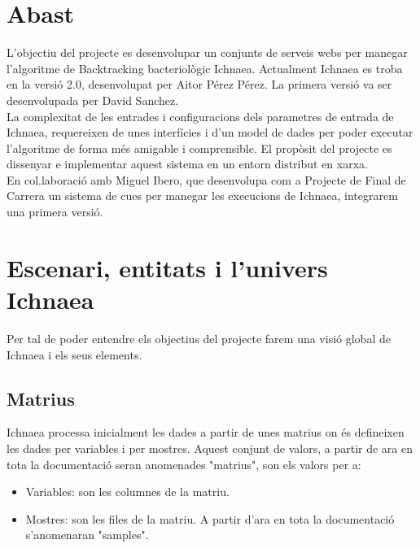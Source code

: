 \section{Abast}
L'objectiu del projecte es desenvolupar un conjunts de serveis webs per manegar l'algoritme de Backtracking bacteriol\`{o}gic Ichnaea. Actualment Ichnaea es troba en la versi\'{o} 2.0, desenvolupat per Aitor P\'{e}rez P\'{e}rez. La primera versi\'{o} va ser desenvolupada per David Sanchez.\\

La complexitat de les entrades i configuracions dels parametres de entrada de Ichnaea, requereixen de unes interf\'{i}cies i d'un model de dades per poder executar l'algoritme de forma m\'{e}s amigable i comprensible. El prop\`{o}sit del projecte es dissenyar e implementar aquest sistema en un entorn distribut en xarxa.\\

En col.laboraci\'{o} amb Miguel Ibero, que desenvolupa com a Projecte de Final de Carrera un sistema de cues per manegar les execucions de Ichnaea, integrarem una primera versi\'{o}.\\


\section{Escenari, entitats i l'univers Ichnaea}
Per tal de poder entendre els objectius del projecte farem una visi\'{o} global de Ichnaea i els seus elements.\\

\subsection{Matrius}
Ichnaea processa inicialment les dades a partir de unes matrius on \'e{s} defineixen les dades per variables i per mostres. Aquest conjunt de valors, a partir de ara en tota la documentaci\'{o} seran anomenades "matrius", son els valors per a:\\
\begin{itemize}
\item Variables: son les columnes de la matriu. 
\item Mostres: son les files de la matriu. A partir d'ara en tota la documentaci\'{o} s'anomenaran "samples".
\end{itemize}

